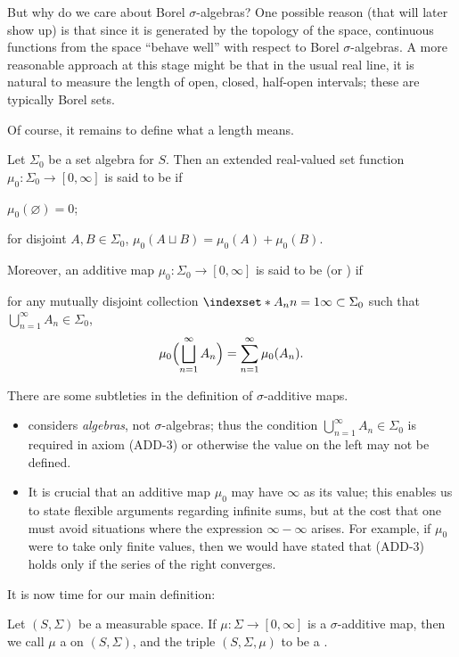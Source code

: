 But why do we care about Borel \(\sigma\)-algebras?
One possible reason (that will later show up) is that
since it is generated by the topology of the space,
continuous functions from the space ``behave well''
with respect to Borel \(\sigma\)-algebras.
A more reasonable approach at this stage might be that
in the usual real line, it is natural to measure
the length of open, closed, half-open intervals;
these are typically Borel sets.

Of course, it remains to define what a length means.

\begin{definition}
    \label{def:addmap}
    Let \(\Sigma_0\) be a set algebra for \(S\).
    Then an extended real-valued set function
    \(\mu_0:\Sigma_0\to[0,\infty]\)
    is said to be  if
    \begin{axioms}[ADD]
        \item \(\mu_0(\varnothing)=0\);
        \item for disjoint \(A,B\in\Sigma_0\),
        \(\mu_0(A\sqcup B)=\mu_0(A)+\mu_0(B)\).
    \end{axioms}
    Moreover, an additive map \(\mu_0:\Sigma_0\to[0,\infty]\)
    is said
    to be  (or )
    if
    \begin{axioms}[ADD]
        \setcounter{enumi}{2}
        \item for any mutually disjoint collection
        \(\indexset*{A_n}{n=1}{\infty}\subset\Sigma_0\)
        such that \(\bigcup_{n=1}^\infty A_n\in\Sigma_0\),
        \[
            \mu_0\Bigl(\bigsqcup_{n=1}^\infty A_n\Bigr)
            =\sum_{n=1}^{\infty}\mu_0(A_n).
        \]
    \end{axioms}
\end{definition}

There are some subtleties in the definition of \(\sigma\)-additive maps.
\begin{itemize}
    \item {} considers \emph{algebras},
    not \(\sigma\)-algebras;
    thus the condition \(\bigcup_{n=1}^\infty A_n\in\Sigma_0\)
    is required in axiom (ADD-3)
    or otherwise the value on the left may not be defined.
    \item It is crucial that
    an additive map \(\mu_0\) may have \(\infty\) as its value;
    this enables us to state flexible arguments regarding infinite sums,
    but at the cost that one must avoid situations
    where the expression \(\infty-\infty\) arises.
    For example,
    if \(\mu_0\) were to take only finite values,
    then we would have stated that
    (ADD-3) holds only if the series of the right converges.
\end{itemize}

It is now time for our main definition:
\begin{definition}
    \label{def:measurespace}
    Let \((S,\Sigma)\) be a measurable space.
    If \(\mu:\Sigma\to[0,\infty]\) is a \(\sigma\)-additive map,
    then we call \(\mu\) a  on \((S,\Sigma)\),
    and the triple \((S,\Sigma,\mu)\) to be a .
\end{definition}